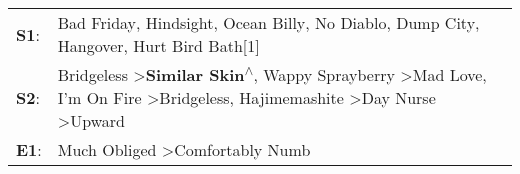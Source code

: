 \begin{supertabular}{p{0.03\textwidth}p{0.92\textwidth}}
 \textbf{S1}:  &                                                                                                                                                               Bad Friday\textsuperscript{}, \enspace Hindsight\textsuperscript{}, \enspace Ocean Billy\textsuperscript{}, \enspace No Diablo\textsuperscript{}, \enspace Dump City\textsuperscript{}, \enspace Hangover\textsuperscript{}, \enspace Hurt Bird Bath[1]\textsuperscript{}  \enspace  \\
 \textbf{S2}:  &  Bridgeless\textsuperscript{} \textgreater \enspace \textbf{Similar Skin\textsuperscript{$\wedge$}}, \enspace Wappy Sprayberry\textsuperscript{} \textgreater \enspace Mad Love\textsuperscript{}, \enspace I'm On Fire\textsuperscript{} \textgreater \enspace Bridgeless\textsuperscript{}, \enspace Hajimemashite\textsuperscript{} \textgreater \enspace Day Nurse\textsuperscript{} \textgreater \enspace Upward\textsuperscript{}  \enspace  \\
 \textbf{E1}:  &                                                                                                                                                                                                                                                                                                                                                 Much Obliged\textsuperscript{} \textgreater \enspace Comfortably Numb\textsuperscript{}  \enspace  \\
\end{supertabular}
